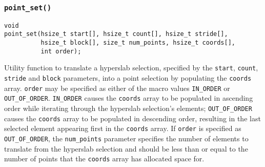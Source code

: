 \documentclass[../HDF5_RFC.tex]{subfiles}
\begin{document}
\subsubsection{\texttt{point\_set()}}

\begin{verbatim}
void
point_set(hsize_t start[], hsize_t count[], hsize_t stride[],
          hsize_t block[], size_t num_points, hsize_t coords[],
          int order);
\end{verbatim}

Utility function to translate a hyperslab selection, specified by the \texttt{start}, \texttt{count}, \texttt{stride} and \texttt{block} parameters, into a point selection by populating the \texttt{coords}
array. \texttt{order} may be specified as either of the macro values \texttt{IN\_ORDER} or
\texttt{OUT\_OF\_ORDER}. \texttt{IN\_ORDER} causes the \texttt{coords} array to be populated in ascending
order while iterating through the hyperslab selection's elements; \texttt{OUT\_OF\_ORDER} causes the
\texttt{coords} array to be populated in descending order, resulting in the last selected element appearing
first in the \texttt{coords} array. If \texttt{order} is specified as \texttt{OUT\_OF\_ORDER}, the
\texttt{num\_points} parameter specifies the number of elements to translate from the hyperslab selection
and should be less than or equal to the number of points that the \texttt{coords} array has allocated space for.
\end{document}
